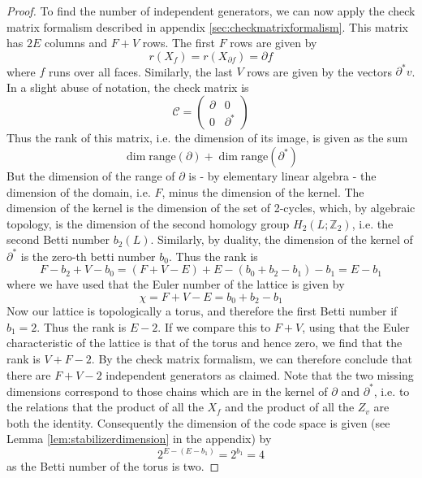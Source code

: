 \documentclass[a4paper, draft]{article}
\theoremstyle{own}
\theoremstyle{remark}
\newcommand{\Z}{\mathbb{Z}}
\begin{document}
\begin{proof}
To find the number of independent generators, we can now apply the check matrix formalism described in appendix \ref{sec:checkmatrixformalism}. This matrix has $2E$ columns and $F + V$ rows. The first $F$ rows are given by
$$
r(X_f) = r(X_{\partial f}) = \partial f
$$
where $f$ runs over all faces. Similarly, the last $V$ rows are given by the vectors $\partial^* v$. In a slight abuse of notation, the check matrix is
$$
\mathcal{C}  = \begin{pmatrix} \partial & 0 \\ 0 & \partial^* \end{pmatrix}
$$
Thus the rank of this matrix, i.e. the dimension of its image, is given as the sum
$$
\dim \text{range}(\partial) + \dim \text{range}(\partial^*)
$$
But the dimension of the range of $\partial$ is - by elementary linear algebra - the dimension of the domain, i.e. $F$, minus the dimension of the kernel. The dimension of the kernel is the dimension of the set of 2-cycles, which, by algebraic topology, is the dimension of the second homology group $H_2(L;\Z_2)$, i.e. the second Betti number $b_2(L)$. Similarly, by duality, the dimension of the kernel of $\partial^*$ is the zero-th betti number $b_0$. Thus the rank is
$$
F - b_2 + V - b_0 = (F + V - E) + E - (b_0 + b_2 - b_1) - b_1 = E - b_1
$$
where we have used that the Euler number of the lattice is given by
$$
\chi = F + V - E = b_0 + b_2 - b_1
$$
Now our lattice is topologically a torus, and therefore the first Betti number if $b_1 = 2$. Thus the rank is $E - 2$. If we compare this to $F + V$, using that the Euler characteristic of the lattice is that of the torus and hence zero, we find that the rank is $V + F - 2$. By the check matrix formalism, we can therefore conclude that there are $F + V - 2$ independent generators as claimed. Note that the two missing dimensions correspond to those chains which are in the kernel of $\partial$ and $\partial^*$, i.e. to the relations that the product of all the $X_f$ and the product of all the $Z_v$ are both the identity. Consequently the dimension of the code space is given (see Lemma \ref{lem:stabilizerdimension} in the appendix) by 
$$
2^{E - (E - b_1)} =2^{b_1} = 4
$$
as the Betti number of the torus is two.
\end{proof}
\end{document}
